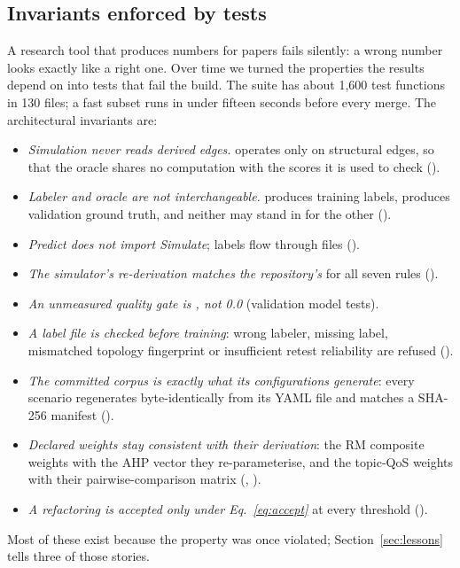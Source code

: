 \subsection{Invariants enforced by tests}
\label{sec:arch:invariants}

A research tool that produces numbers for papers fails silently: a wrong number looks exactly like a right one. Over time we turned the properties the results depend on into tests that fail the build. The suite has about 1,600 test functions in 130 files; a fast subset runs in under fifteen seconds before every merge. The architectural invariants are:
\begin{itemize}\tightlist
  \item \emph{Simulation never reads derived edges.}  operates only on structural edges, so that the oracle shares no computation with the scores it is used to check ().
  \item \emph{Labeler and oracle are not interchangeable.}  produces training labels,  produces validation ground truth, and neither may stand in for the other ().
  \item \emph{Predict does not import Simulate}; labels flow through files ().
  \item \emph{The simulator's re-derivation matches the repository's} for all seven rules ().
  \item \emph{An unmeasured quality gate is , not 0.0} (validation model tests).
  \item \emph{A label file is checked before training}: wrong labeler, missing label, mismatched topology fingerprint or insufficient retest reliability are refused ().
  \item \emph{The committed corpus is exactly what its configurations generate}: every scenario regenerates byte-identically from its YAML file and matches a SHA-256 manifest ().
  \item \emph{Declared weights stay consistent with their derivation}: the RM composite weights with the AHP vector they re-parameterise, and the topic-QoS weights with their pairwise-comparison matrix (, ).
  \item \emph{A refactoring is accepted only under Eq.~\eqref{eq:accept}} at every threshold ().
\end{itemize}
Most of these exist because the property was once violated; Section~\ref{sec:lessons} tells three of those stories.
